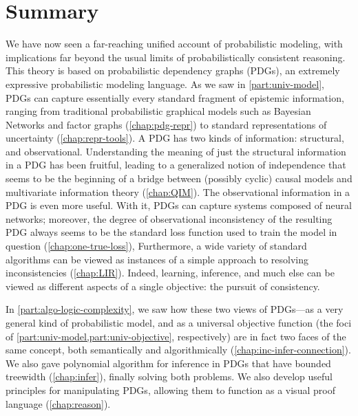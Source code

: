 
\section{Summary}

We have now seen a far-reaching unified account of probabilistic modeling,
    with implications far beyond the usual limits of probabilistically consistent reasoning. 
%
This theory is based on probabilistic dependency graphs (PDGs), an extremely expressive probabilistic modeling language.
As we saw in \cref{part:univ-model}, PDGs can capture essentially every standard fragment of epistemic information, ranging from traditional probabilistic graphical models such as Bayesian Networks and factor graphs (\cref{chap:pdg-repr}) to standard representations of uncertainty (\cref{chap:repr-tools}).
A PDG has two kinds of information: structural, and observational.
Understanding the meaning of just the structural information in a PDG has been fruitful, leading to a generalized notion of independence that seems to be the beginning of a bridge between (possibly cyclic) causal models and multivariate information theory (\cref{chap:QIM}). 
%
The observational information in a PDG is even more useful. 
With it, PDGs can capture systems composed of neural networks; moreover, 
    the degree of observational inconsistency of the resulting PDG always seems to be the standard loss function used to train the model in question (\cref{chap:one-true-loss}),
Furthermore, a wide variety of standard algorithms can be viewed as instances of a simple approach to resolving inconsistencies (\cref{chap:LIR}).
Indeed, learning, inference, and 
    much else can be viewed as different aspects of a single objective: the pursuit of consistency. 

In \cref{part:algo-logic-complexity}, we saw how these two views of PDGs---as a very general kind of probabilistic model, and as a universal objective function (the foci of \cref{part:univ-model,part:univ-objective}, respectively) are in fact two faces of the same concept, both semantically and algorithmically (\cref{chap:inc-infer-connection}). 
We also gave polynomial algorithm for inference in PDGs that have bounded treewidth (\cref{chap:infer}), finally solving both problems. 
We also develop useful principles for manipulating PDGs, 
    allowing them to function as a visual proof language (\cref{chap:reason}).


